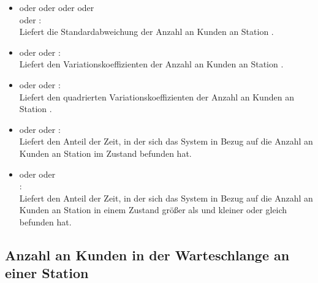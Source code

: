 \begin{itemize}
\item
{} oder  oder  oder  oder\\
 oder :\\
Liefert die Standardabweichung der Anzahl an Kunden an Station .

\item
{} oder  oder :\\
Liefert den Variationskoeffizienten der Anzahl an Kunden an Station .

\item
{} oder  oder :\\
Liefert den quadrierten Variationskoeffizienten der Anzahl an Kunden an Station .

\item
{} oder  oder :\\
Liefert den Anteil der Zeit, in der sich das System in Bezug auf die Anzahl an Kunden an Station  im Zustand  befunden hat.

\item
{} oder  oder\\
:\\
Liefert den Anteil der Zeit, in der sich das System in Bezug auf die Anzahl an Kunden an Station  in einem Zustand größer als  und kleiner oder gleich  befunden hat.

\end{itemize}



\subsection{Anzahl an Kunden in der Warteschlange an einer Station}

